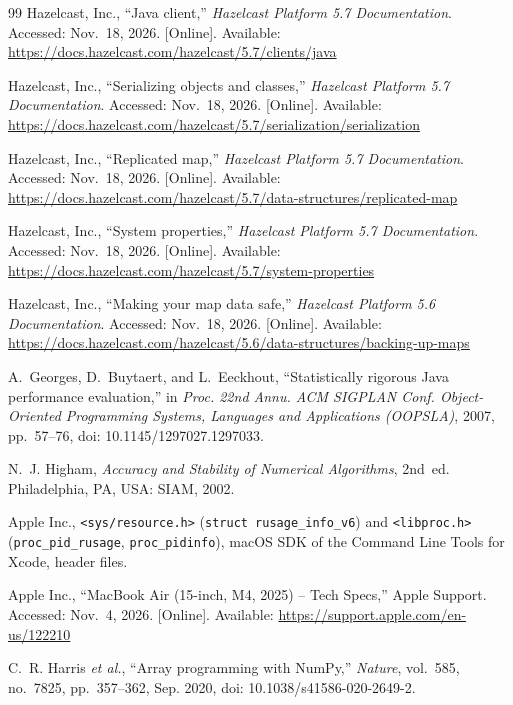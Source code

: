\documentclass[11pt,a4paper]{article}
\begin{document}
\begin{thebibliography}{99}
Hazelcast, Inc., ``Java client,'' \emph{Hazelcast Platform 5.7 Documentation}.
Accessed: Nov.~18, 2026. [Online]. Available:
\url{https://docs.hazelcast.com/hazelcast/5.7/clients/java}

Hazelcast, Inc., ``Serializing objects and classes,'' \emph{Hazelcast Platform
5.7 Documentation}. Accessed: Nov.~18, 2026. [Online]. Available:
\url{https://docs.hazelcast.com/hazelcast/5.7/serialization/serialization}

Hazelcast, Inc., ``Replicated map,'' \emph{Hazelcast Platform 5.7
Documentation}. Accessed: Nov.~18, 2026. [Online]. Available:
\url{https://docs.hazelcast.com/hazelcast/5.7/data-structures/replicated-map}

Hazelcast, Inc., ``System properties,'' \emph{Hazelcast Platform 5.7
Documentation}. Accessed: Nov.~18, 2026. [Online]. Available:
\url{https://docs.hazelcast.com/hazelcast/5.7/system-properties}

Hazelcast, Inc., ``Making your map data safe,'' \emph{Hazelcast Platform 5.6
Documentation}. Accessed: Nov.~18, 2026. [Online]. Available:
\url{https://docs.hazelcast.com/hazelcast/5.6/data-structures/backing-up-maps}

A.~Georges, D.~Buytaert, and L.~Eeckhout, ``Statistically rigorous Java
performance evaluation,'' in \emph{Proc. 22nd Annu. ACM SIGPLAN Conf.
Object-Oriented Programming Systems, Languages and Applications (OOPSLA)},
2007, pp.~57--76, doi: 10.1145/1297027.1297033.

N.~J. Higham, \emph{Accuracy and Stability of Numerical Algorithms}, 2nd~ed.
Philadelphia, PA, USA: SIAM, 2002.

Apple Inc., \texttt{<sys/resource.h>} (\texttt{struct rusage\_info\_v6}) and
\texttt{<libproc.h>} (\texttt{proc\_pid\_rusage}, \texttt{proc\_pidinfo}), macOS
SDK of the Command Line Tools for Xcode, header files.

Apple Inc., ``MacBook Air (15-inch, M4, 2025) -- Tech Specs,'' Apple Support.
Accessed: Nov.~4, 2026. [Online]. Available:
\url{https://support.apple.com/en-us/122210}

C.~R. Harris \emph{et al.}, ``Array programming with NumPy,'' \emph{Nature},
vol.~585, no.~7825, pp.~357--362, Sep. 2020, doi: 10.1038/s41586-020-2649-2.

\end{thebibliography}
\end{document}
